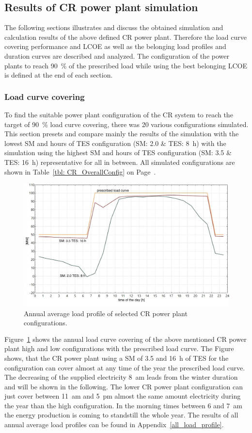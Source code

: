 \subsection{Results of CR power plant simulation}
The following sections illustrates and discuss the obtained simulation and calculation results of the above defined CR power plant. Therefore the load curve covering performance and LCOE as well as the belonging load profiles and duration curves are described and analyzed. The configuration of the power plants to reach 90~\% of the prescribed load while using the best belonging LCOE is defined at the end of each section.
\subsubsection{Load curve covering}
To find the suitable power plant configuration of the CR system to reach the target of 90~\% load curve covering, there was 20 various configurations simulated. This section presets and compare mainly the results of the simulation with the lowest SM and hours of TES configuration (SM: 2.0 \& TES: \SI{8}{h}) with the simulation using the highest SM and hours of TES configuration (SM: 3.5 \& TES: \SI{16}{h}) representative for all in between. All simulated configurations are shown in Table~\ref{tbl: CR_OverallConfig} on Page~\pageref{tbl: CR_OverallConfig}.

\begin{figure}[htbp]  
\centering
\includegraphics[width=0.8\linewidth]{FIG/CR_annual_profil}
\caption[Annual average load profile of selected CR power plant configurations.]{Annual average load profile of selected CR power plant configurations.}\label{CR_annual_profil}
\end{figure}
Figure~\ref{CR_annual_profil} shows the annual load curve covering of the above mentioned CR power plant high and low configurations with the prescribed load curve. The Figure shows, that the CR power plant using a SM of 3.5 and \SI{16}{h} of TES for the configuration can cover almost at any time of the year the prescribed load curve. The decreasing of the supplied electricity \SI{8}{am} leads from the winter duration and will be shown in the following. The lower CR power plant configuration can just cover between \SI{11}{am} and \SI{5}{pm} almost the same amount electricity during the year than the high configuration. In the morning times between 6 and \SI{7}{am} the energy production is coming to standstill the whole year. The results of all annual average load profiles can be found in Appendix~\ref{all_load_profile}.

